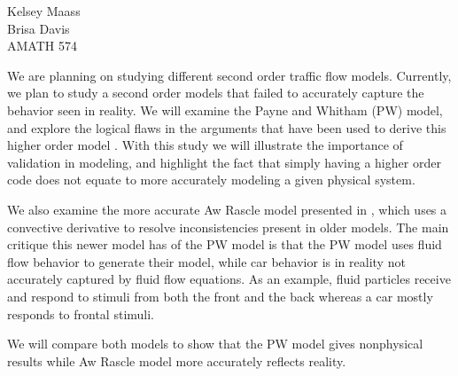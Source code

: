 \documentclass[10pt,a4paper]{article}
\begin{document}
\noindent Kelsey Maass \\
Brisa Davis \\
AMATH 574\\
\vspace{0.2in}

We are planning on studying different second order traffic flow models. Currently, we plan to study a second order models that failed to accurately capture the behavior seen in reality. We will examine the Payne and Whitham (PW) model, and explore the logical flaws in the arguments that have been used to derive this higher order model \cite{Daganzo1995}. With this study we will illustrate the importance of validation in modeling, and highlight the fact that simply having a higher order code does not equate to more accurately modeling a given physical system.

We also examine the more accurate Aw Rascle model presented in \cite{AwRascle2000}, which uses a convective derivative to resolve inconsistencies present in older models. The main critique this newer model has of the PW model is that the PW model uses fluid flow behavior to generate their model, while car behavior is in reality not accurately captured by fluid flow equations. As an example, fluid particles receive and respond to stimuli from both the front and the back whereas a car mostly responds to frontal stimuli. 

We will compare both models to show that the PW model gives nonphysical results while Aw Rascle model more accurately reflects reality. 

{}

\end{document}
